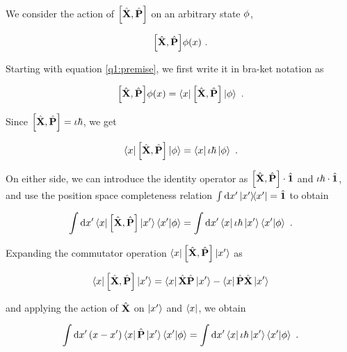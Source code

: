We consider the action of $\commutator{\Position}{\Momentum}$ 
on an arbitrary state $\phi$, 

\begin{equation}
    \commutator{\Position}{\Momentum} \statephi(\position)~.
    \label{q1:premise}
\end{equation}

Starting with equation \ref{q1:premise}, we first write it in
bra-ket notation as

\begin{equation}
    \commutator{\Position}{\Momentum} \statephi(\position) = 
        \bra{\position} \commutator{\Position}{\Momentum} \ket{\statephi}~.
\end{equation}

Since $\commutator{\Position}{\Momentum} = \iota \hbar$, we get

\begin{equation}
    \bra{\position} \commutator{\Position}{\Momentum} \ket{\statephi} =
        \bra{\position} \iota \hbar \ket{\statephi}~.
\end{equation}

On either side, we can introduce the identity operator as 
$\commutator{\Position}{\Momentum} \cdot \Identity$ and 
$\iota \hbar \cdot \hat{\textbf{1}}$, and use the 
position space completeness relation $\int 
\dd{x'} \ketbra{x'}{x'} = \hat{\textbf{1}}$ to obtain

\begin{equation}
    \int \dd{\position'} \bra{\position}\commutator{\Position}{\Momentum}
    \ket{\position'}\braket{\position'}{\statephi} =
    \int \dd{\position'} \bra{\position}\iota \hbar
    \ket{\position'}\braket{\position'}{\statephi}~.
\end{equation}

Expanding the commutator operation $\bra{\position}
\commutator{\Position}{\Momentum}\ket{\position'}$ as

\begin{equation}
    \bra{\position}\commutator{\Position}{\Momentum}\ket{\position'}
    = \bra{\position}\Position\Momentum\ket{\position'} - 
        \bra{\position}\Momentum\Position\ket{\position'} 
    \nonumber
\end{equation}

and applying the action of $\hat{\textbf{X}}$ on $\ket{x'}$
and $\bra{x}$, we obtain

\begin{equation}
    \int \dd{x'} (x - x')\bra{x}\hat{\textbf{P}}
    \ket{x'}\braket{x'}{\phi} =
    \int \dd{x'} \bra{x}\iota \hbar
    \ket{x'}\braket{x'}{\phi}~.
\end{equation}

